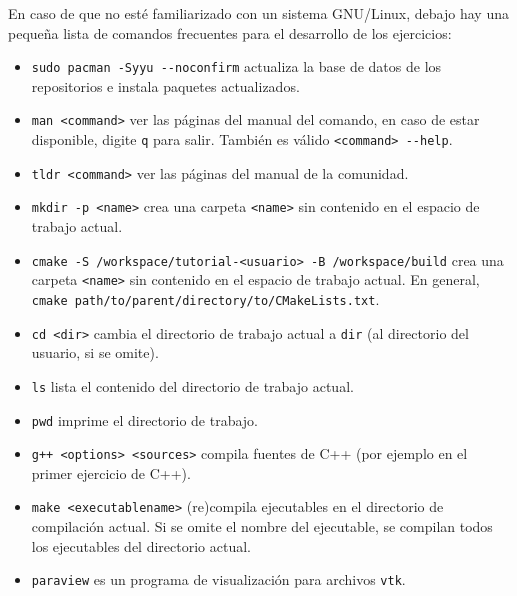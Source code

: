 \documentclass[9pt,a3paper]{scrartcl}
\begin{document}
En caso de que no esté familiarizado con un sistema GNU/Linux, debajo
hay una pequeña lista de comandos frecuentes para el desarrollo de
los ejercicios:
\begin{itemize}
	\item

	      \verb!sudo pacman -Syyu --noconfirm! actualiza la base de
	      datos de los repositorios e instala paquetes actualizados.

	\item

	      \verb!man <command>! ver las páginas del manual del comando,
	      en caso de estar disponible, digite \verb!q! para salir.
	      También es válido \verb!<command> --help!.

	\item

	      \verb!tldr <command>! ver las páginas del manual de la
	      comunidad.

	\item

	      \verb!mkdir -p <name>! crea una carpeta \verb!<name>! sin
	      contenido en el espacio de trabajo actual.

	\item

	      \verb!cmake -S /workspace/tutorial-<usuario> -B /workspace/build!
	      crea una carpeta
	      \verb!<name>! sin contenido en el espacio de trabajo actual.
	      En general, \verb!cmake path/to/parent/directory/to/CMakeLists.txt!.

	\item

	      \verb!cd <dir>! cambia el directorio de trabajo actual
	      a \verb!dir! (al directorio del usuario, si se omite).

	\item

	      \verb!ls! lista el contenido del directorio de trabajo actual.

	\item

	      \verb!pwd! imprime el directorio de trabajo.

	\item

	      \verb!g++ <options> <sources>! compila fuentes de C++
	      (por ejemplo en el primer ejercicio de C++).

	\item

	      \verb!make <executablename>! (re)compila ejecutables en el
	      directorio de compilación actual.
	      Si se omite el nombre del ejecutable, se compilan todos los
	      ejecutables del directorio actual.

	\item

	      \verb!paraview! es un programa de visualización para archivos
	      \verb!vtk!.
\end{itemize}
\end{document}
